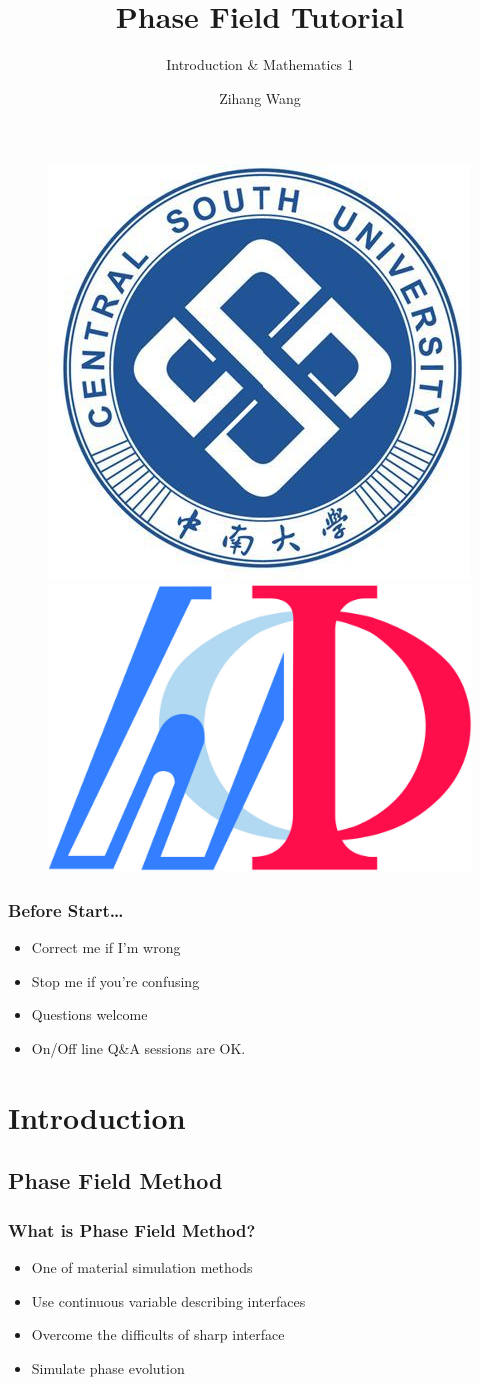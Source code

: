 \documentclass[compress]{beamer}
\author{Zihang Wang}
\title{Phase Field Tutorial}
\subtitle{Introduction \& Mathematics 1}
\institute{Central South University}
\begin{document}
\begin{frame}
  \titlepage
  \begin{figure}[!h]
    \centering
    \includegraphics[width=0.2\linewidth]{pic/csulogo.jpg}
    \includegraphics[width=0.27\linewidth]{pic/MInDes_Icon.jpg}
  \end{figure}
\end{frame}

\begin{frame}
  \frametitle{Before Start\dots}
  \begin{itemize}
    \item Correct me if I'm wrong
    \item Stop me if you're confusing
    \item Questions welcome
    \item On/Off line Q\&A sessions are OK.
  \end{itemize}
\end{frame}


\begin{frame}
  \tableofcontents[currentsection, hideothersubsections, sectionstyle=show/show]
\end{frame}

\section{Introduction}
\subsection{{Phase Field Method}}

\begin{frame}
  \frametitle{What is Phase Field Method?}
  \begin{itemize}
    \item One of material simulation methods
    \item Use continuous variable describing interfaces
    \item Overcome the difficults of sharp interface
    \item Simulate phase evolution
  \end{itemize}
\end{frame}
\end{document}
